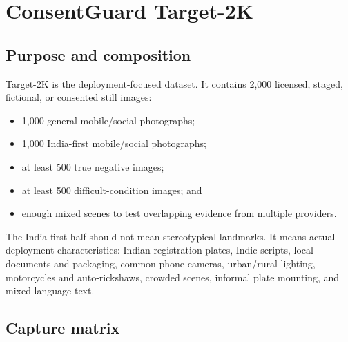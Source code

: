\chapter{ConsentGuard Target-2K}

\section{Purpose and composition}

Target-2K is the deployment-focused dataset. It contains 2,000 licensed, staged, fictional, or consented still images:

\begin{itemize}[leftmargin=6mm]
  \item 1,000 general mobile/social photographs;
  \item 1,000 India-first mobile/social photographs;
  \item at least 500 true negative images;
  \item at least 500 difficult-condition images; and
  \item enough mixed scenes to test overlapping evidence from multiple providers.
\end{itemize}

The India-first half should not mean stereotypical landmarks. It means actual deployment characteristics: Indian registration plates, Indic scripts, local documents and packaging, common phone cameras, urban/rural lighting, motorcycles and auto-rickshaws, crowded scenes, informal plate mounting, and mixed-language text.

\section{Capture matrix}

